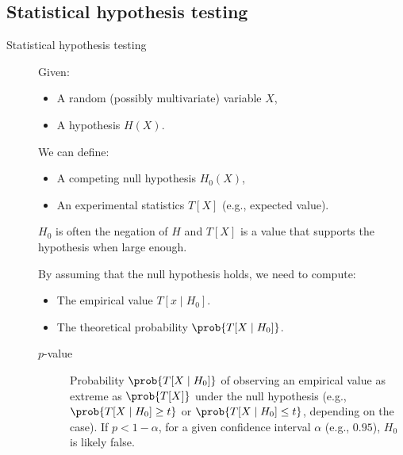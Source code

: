 \subsection{Statistical hypothesis testing}

\begin{description}
    \item[Statistical hypothesis testing] 
        Given:
        \begin{itemize}
            \item A random (possibly multivariate) variable $X$,
            \item A hypothesis $H(X)$.
        \end{itemize}
        We can define:
        \begin{itemize}
            \item A competing null hypothesis $H_0(X)$,
            \item An experimental statistics $T[X]$ (e.g., expected value).
        \end{itemize} 

        \begin{remark}
            $H_0$ is often the negation of $H$ and $T[X]$ is a value that supports the hypothesis when large enough.
        \end{remark}

        By assuming that the null hypothesis holds, we need to compute:
        \begin{itemize}
            \item The empirical value $T[x \mid H_0]$.
            \item The theoretical probability $\prob{T[X \mid H_0]}$.
        \end{itemize}

        \begin{description}
            \item[$p$-value]  
                Probability $\prob{T[X \mid H_0]}$ of observing an empirical value as extreme as $\prob{T[X]}$ under the null hypothesis (e.g., $\prob{T[X \mid H_0] \geq t}$ or  $\prob{T[X \mid H_0] \leq t}$, depending on the case). If $p < 1-\alpha$, for a given confidence interval $\alpha$ (e.g., $0.95$), $H_0$ is likely false.
        \end{description}
\end{description}

